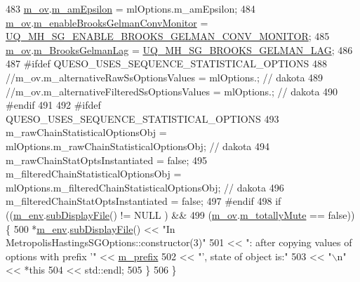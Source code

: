\begin{DoxyCode}
483   \hyperlink{class_q_u_e_s_o_1_1_metropolis_hastings_s_g_options_a9d4792d9fc2dc5439b8ab489b0c236eb}{m\_ov}.\hyperlink{class_q_u_e_s_o_1_1_mh_options_values_af899c001e1bbdaf9c740d6b4dc0e13e0}{m\_amEpsilon}                                 = mlOptions.m\_amEpsilon;
484   \hyperlink{class_q_u_e_s_o_1_1_metropolis_hastings_s_g_options_a9d4792d9fc2dc5439b8ab489b0c236eb}{m\_ov}.\hyperlink{class_q_u_e_s_o_1_1_mh_options_values_afae1b3bf96ee3657212fa91ac7859bb7}{m\_enableBrooksGelmanConvMonitor}             = 
      \hyperlink{_metropolis_hastings_s_g_options_8h_a613c77a068bcef4aba2d68f03677eaf7}{UQ\_MH\_SG\_ENABLE\_BROOKS\_GELMAN\_CONV\_MONITOR};
485   \hyperlink{class_q_u_e_s_o_1_1_metropolis_hastings_s_g_options_a9d4792d9fc2dc5439b8ab489b0c236eb}{m\_ov}.\hyperlink{class_q_u_e_s_o_1_1_mh_options_values_a574f8a1d72eb5d45af5ab0c020a69447}{m\_BrooksGelmanLag}                           = 
      \hyperlink{_metropolis_hastings_s_g_options_8h_a47c0e6fa59a29fa680a23470018b31b0}{UQ\_MH\_SG\_BROOKS\_GELMAN\_LAG};
486 
487 \textcolor{preprocessor}{#ifdef QUESO\_USES\_SEQUENCE\_STATISTICAL\_OPTIONS}
488 \textcolor{preprocessor}{}\textcolor{comment}{//m\_ov.m\_alternativeRawSsOptionsValues             = mlOptions.; // dakota}
489 \textcolor{comment}{//m\_ov.m\_alternativeFilteredSsOptionsValues        = mlOptions.; // dakota}
490 \textcolor{preprocessor}{#endif}
491 \textcolor{preprocessor}{}
492 \textcolor{preprocessor}{#ifdef QUESO\_USES\_SEQUENCE\_STATISTICAL\_OPTIONS}
493 \textcolor{preprocessor}{}  m\_rawChainStatisticalOptionsObj                  = mlOptions.m\_rawChainStatisticalOptionsObj; \textcolor{comment}{// dakota}
494   m\_rawChainStatOptsInstantiated                   = \textcolor{keyword}{false};
495   m\_filteredChainStatisticalOptionsObj             = mlOptions.m\_filteredChainStatisticalOptionsObj; \textcolor{comment}{//
       dakota}
496   m\_filteredChainStatOptsInstantiated              = \textcolor{keyword}{false};
497 \textcolor{preprocessor}{#endif}
498 \textcolor{preprocessor}{}  \textcolor{keywordflow}{if} ((\hyperlink{class_q_u_e_s_o_1_1_metropolis_hastings_s_g_options_a328a978b771885e14d536272ff4aa9ef}{m\_env}.\hyperlink{class_q_u_e_s_o_1_1_base_environment_a8a0064746ae8dddfece4229b9ad374d6}{subDisplayFile}() != NULL ) &&
499       (\hyperlink{class_q_u_e_s_o_1_1_metropolis_hastings_s_g_options_a9d4792d9fc2dc5439b8ab489b0c236eb}{m\_ov}.\hyperlink{class_q_u_e_s_o_1_1_mh_options_values_af812309e81191e88dfdc87c5815141a3}{m\_totallyMute}     == \textcolor{keyword}{false})) \{
500     *\hyperlink{class_q_u_e_s_o_1_1_metropolis_hastings_s_g_options_a328a978b771885e14d536272ff4aa9ef}{m\_env}.\hyperlink{class_q_u_e_s_o_1_1_base_environment_a8a0064746ae8dddfece4229b9ad374d6}{subDisplayFile}() << \textcolor{stringliteral}{"In MetropolisHastingsSGOptions::constructor(3)"}
501                             << \textcolor{stringliteral}{": after copying values of options with prefix '"} << 
      \hyperlink{class_q_u_e_s_o_1_1_metropolis_hastings_s_g_options_a4f7c510aaa530336d24259e2a89f5d0b}{m\_prefix}
502                             << \textcolor{stringliteral}{"', state of object is:"}
503                             << \textcolor{stringliteral}{"\(\backslash\)n"} << *\textcolor{keyword}{this}
504                             << std::endl;
505   \}
506 \}
\end{DoxyCode}
